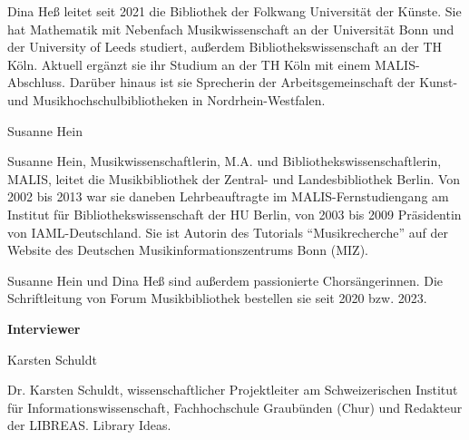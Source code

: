 \documentclass[a4paper,
fontsize=11pt,
oneside,
numbers=noperiodatend,
parskip=half-,
bibliography=totoc,
final
]{scrartcl}
\begin{document}
Dina Heß leitet seit 2021 die Bibliothek der Folkwang Universität der Künste. 
Sie hat Mathematik mit Nebenfach Musikwissenschaft an der Universität Bonn und 
der University of Leeds studiert, außerdem Bibliothekswissenschaft an der TH Köln. 
Aktuell ergänzt sie ihr Studium an der TH Köln mit einem MALIS-Abschluss. Darüber 
hinaus ist sie Sprecherin der Arbeitsgemeinschaft der Kunst- und Musikhochschulbibliotheken 
in Nordrhein-Westfalen.

Susanne Hein

Susanne Hein, Musikwissenschaftlerin, M.A. und Bibliothekswissenschaftlerin, MALIS, 
leitet die Musikbibliothek der Zentral- und Landesbibliothek Berlin. Von 2002 bis 2013 
war sie daneben Lehrbeauftragte im MALIS-Fernstudiengang am Institut für Bibliothekswissenschaft 
der HU Berlin, von 2003 bis 2009 Präsidentin von IAML-Deutschland. Sie ist Autorin des Tutorials 
\enquote{Musikrecherche} auf der Website des Deutschen Musikinformationszentrums Bonn (MIZ).

Susanne Hein und Dina Heß sind außerdem passionierte Chorsängerinnen. Die Schriftleitung von Forum 
Musikbibliothek bestellen sie seit 2020 bzw. 2023.

\textbf{Interviewer}

Karsten Schuldt
 
Dr. Karsten Schuldt, wissenschaftlicher Projektleiter am Schweizerischen Institut für Informationswissenschaft,
Fachhochschule Graubünden (Chur) und Redakteur der LIBREAS. Library Ideas.
\end{document}
